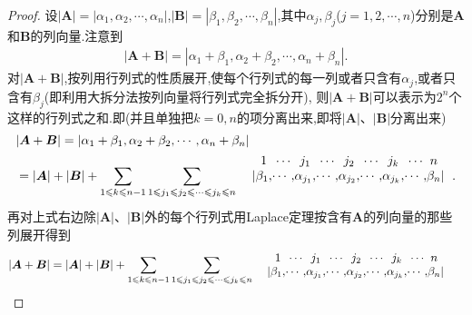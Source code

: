 \documentclass[../../main.tex]{subfiles}%
\begin{document}
\begin{proof}
设\(|\boldsymbol{A}| = |\alpha_1,\alpha_2,\cdots,\alpha_n|\),\(|\boldsymbol{B}| = |\beta_1,\beta_2,\cdots,\beta_n|\),其中\(\alpha_j,\beta_j\)(\(j = 1,2,\cdots,n\))分别是\(\boldsymbol{A}\)和\(\boldsymbol{B}\)的列向量.注意到
\begin{align*}
|\boldsymbol{A} + \boldsymbol{B}| = |\alpha_1 + \beta_1,\alpha_2 + \beta_2,\cdots,\alpha_n + \beta_n|.
\end{align*}
对\(|\boldsymbol{A} + \boldsymbol{B}|\),按列用行列式的性质展开,使每个行列式的每一列或者只含有\(\alpha_j\),或者只含有\(\beta_j\)(即利用大拆分法按列向量将行列式完全拆分开),
则\(|\boldsymbol{A} + \boldsymbol{B}|\)可以表示为\(2^n\)个这样的行列式之和.即(并且单独把\(k = 0,n\)的项分离出来,即将\(|\boldsymbol{A}|\)、\(|\boldsymbol{B}|\)分离出来)
\begin{align*}
&|\boldsymbol{A} + \boldsymbol{B}| = |\alpha_1 + \beta_1,\alpha_2 + \beta_2,\cdots,\alpha_n + \beta_n| 
\\
&=|\boldsymbol{A}|+|\boldsymbol{B}|+\sum_{1\leqslant k\leqslant n-1}{\sum_{1\leqslant  j_1\leqslant  j_2\leqslant  \cdots\leqslant  j_k\leqslant  n}{\begin{array}{c}
\begin{array}{c@{}c@{}c@{}c@{}c@{}c@{}c@{}c@{}c@{}c@{}c@{}}
& 1 & \cdots & j_1 &\cdots &j_2 &\cdots &j_k &\cdots &n \\
\left.\right|
&\beta _1,&\cdots ,&\alpha _{j_1},&\cdots ,&\alpha_{j_2},&\cdots ,&\alpha_{j_k},&\cdots ,&\beta_n& \left|\right.
\end{array}\\
\\
\end{array}}}.
\end{align*}
再对上式右边除\(|\boldsymbol{A}|\)、\(|\boldsymbol{B}|\)外的每个行列式用Laplace定理按含有\(\boldsymbol{A}\)的列向量的那些列展开得到
\begin{align*}
&|\boldsymbol{A} + \boldsymbol{B}| =|\boldsymbol{A}|+|\boldsymbol{B}|+\sum_{1\leqslant k\leqslant n-1}{\sum_{1\leqslant  j_1\leqslant  j_2\leqslant  \cdots\leqslant  j_k\leqslant  n}{\begin{array}{c}
\begin{array}{c@{}c@{}c@{}c@{}c@{}c@{}c@{}c@{}c@{}c@{}c@{}}
& 1 & \cdots & j_1 &\cdots &j_2 &\cdots &j_k &\cdots &n \\
\left.\right|
&\beta _1,&\cdots ,&\alpha _{j_1},&\cdots ,&\alpha_{j_2},&\cdots ,&\alpha_{j_k},&\cdots ,&\beta_n& \left|\right.
\end{array}\\

\end{array}}}
\end{align*}
\end{proof}
\end{document}
